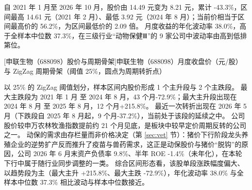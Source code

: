  自 2021 年 1 月至 2026 年 10 月，股价由 14.49 元变为 8.21 元，累计 -43.3\%，区间最高 14.61 元（2021 年 2 月）、最低 3.92 元（2024 年 8 月）；当前价相当于区间最高价的 56.2\%，为区间最低价的 2.09 倍。 月度收益的年化波动率 38.0\%，高于全样本中位数 37.3\%，在三级行业“动物保健Ⅲ”的 9 家公司中波动率由高到低排第位。

\begin{center}
\begin{minipage}{\textwidth}\centering
{}

[申联生物（688098）股价与周期骨架]{申联生物（688098）月度收盘价（元/股）与 ZigZag 周期骨架（阈值 25\%，圆点为周期转折点）}
\end{minipage}
\end{center}

 以 25\% 的 ZigZag 阈值划分，样本区间内股价形成 1 个主升段与 2 个主跌段。 最大主跌段为 2021 年 1 月 至 2024 年 8 月，43 个月-72.9\%；最大主升段出现在 2024 年 8 月 至 2025 年 8 月，12 个月+215.8\%。 最近一次转折出现在 2026 年 5 月（下跌段自 2025 年 8 月起，9 个月-37.2\%），当前处于该段的延续之中。 公司股价较申万农林牧渔指数提前约 21 个月见底，是板块中较早定价周期反转的公司之一。 动保的需求由存栏量而非价格决定（第 \ref{sec:vet} 节）：猪价下行阶段龙头养殖企业的逆势扩产反而推升了疫苗与兽药需求，这正是动保股价与猪价“脱钩”的原因，公司 2026 年 6 月末资产负债率 9.8\%、半年 ROE -1.4\%（未年化），在本轮下行中属于随行业同步调整的一类。 综合区间形态看，该股单段涨跌幅度偏大、以趋势段为主（最大主升 +215.8\%、最大主跌 -72.9\%），年化波动率 38.0\% 与全样本中位数 37.3\% 相比波动与样本中位数接近。

